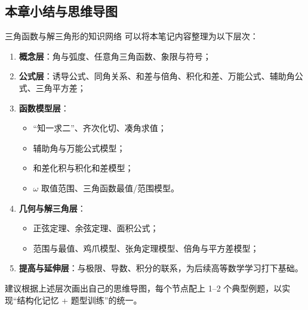 \documentclass[a4paper,11pt]{ctexart}
\begin{document}
\subsection{本章小结与思维导图}

\begin{summarybox}[mathnote coverage=soft]{三角函数与解三角形的知识网络}
可以将本笔记内容整理为以下层次：
\begin{enumerate}
  \item \textbf{概念层}：角与弧度、任意角三角函数、象限与符号；
  \item \textbf{公式层}：诱导公式、同角关系、和差与倍角、积化和差、万能公式、辅助角公式、三角平方差；
  \item \textbf{函数模型层}：
  \begin{itemize}
    \item “知一求二”、齐次化切、凑角求值；
    \item 辅助角与万能公式模型；
    \item 和差化积与积化和差模型；
    \item $\omega$ 取值范围、三角函数最值/范围模型。
  \end{itemize}
  \item \textbf{几何与解三角层}：
  \begin{itemize}
    \item 正弦定理、余弦定理、面积公式；
    \item 范围与最值、鸡爪模型、张角定理模型、倍角与平方差模型；
  \end{itemize}
  \item \textbf{提高与延伸层}：与极限、导数、积分的联系，为后续高等数学学习打下基础。
\end{enumerate}
建议根据上述层次画出自己的思维导图，每个节点配上 1--2 个典型例题，以实现“结构化记忆 + 题型训练”的统一。
\end{summarybox}

\ifdefined\MathNoteBookMode\else
\end{document}

